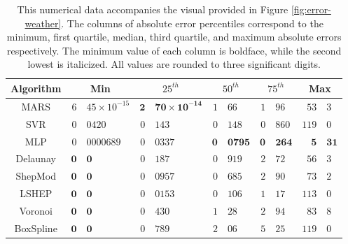 \documentclass[doublespace,nopageskip]{VTthesis} %
\begin{document}
\begin{appendices}
  \begin{table}
    \centering
    \begin{tabular}{c|r@{.}l|r@{.}l|r@{.}l|r@{.}l|r@{.}l}
      \hline
      Algorithm & \multicolumn{2}{c|}{Min} & \multicolumn{2}{c|}{$25^{th}$} & \multicolumn{2}{c|}{$50^{th}$} & \multicolumn{2}{c|}{$75^{th}$} & \multicolumn{2}{c}{Max}\\
      \hline
      MARS & $\mathit{6}$&$\mathit{45 \times 10^{-15}}$ & $\mathbf{2}$&$\mathbf{70 \times 10^{-14}}$ & $1$&$66$ & $1$&$96$ & $\mathit{53}$&$\mathit{3}$\\
      SVR & $0$&$0420$ & $0$&$143$ & $0$&$148$ & $\mathit{0}$&$\mathit{860}$ & $119$&$0$\\
      MLP & $0$&$0000689$ & $0$&$0337$ & $\mathbf{0}$&$\mathbf{0795}$ & $\mathbf{0}$&$\mathbf{264}$ & $\mathbf{5}$&$\mathbf{31}$\\
      Delaunay & $\mathbf{0}$&$\mathbf{0}$ & $0$&$187$ & $0$&$919$ & $2$&$72$ & $56$&$3$\\
      ShepMod & $\mathbf{0}$&$\mathbf{0}$ & $0$&$0957$ & $0$&$685$ & $2$&$90$ & $73$&$2$\\
      LSHEP & $\mathbf{0}$&$\mathbf{0}$ & $\mathit{0}$&$\mathit{0153}$ & $\mathit{0}$&$\mathit{106}$ & $1$&$17$ & $113$&$0$\\
      Voronoi & $\mathbf{0}$&$\mathbf{0}$ & $0$&$430$ & $1$&$28$ & $2$&$94$ & $83$&$8$\\
      BoxSpline & $\mathbf{0}$&$\mathbf{0}$ & $0$&$789$ & $2$&$06$ & $5$&$25$ & $119$&$0$\\
      \hline
    \end{tabular}
    \caption{This numerical data accompanies the visual provided in
      Figure \ref{fig:error-weather}. The columns of absolute error
      percentiles correspond to the minimum, first quartile, median,
      third quartile, and maximum absolute errors respectively. The
      minimum value of each column is boldface, while the second lowest
      is italicized. All values are rounded to three significant
      digits.}
    \label{table:error-weather}
  \end{table}


\end{appendices}
\end{document}
